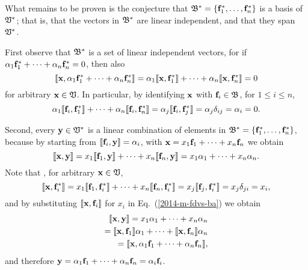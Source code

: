 What remains to be proven is the conjecture that
${\frak B}^\ast  = \{{\bf f}_1^\ast ,\ldots , {\bf f}_n^\ast \}$
is a basis of ${\frak V}^\ast $; that is, that the vectors in ${\frak B}^\ast $ are linear independent,
and that they span ${\frak V}^\ast $.

First observe that ${\frak B}^\ast $ is a set of linear independent vectors,
for if
$ \alpha_1 {\bf f}_1^\ast  + \cdots + \alpha_n {\bf f}_n^\ast =0$, then also
\begin{equation}
 \llbracket {\bf x},\alpha_1 {\bf f}_1^\ast  + \cdots + \alpha_n {\bf f}_n^\ast \rrbracket =
 \alpha_1 \llbracket {\bf x},{\bf f}_1^\ast \rrbracket  + \cdots + \alpha_n \llbracket {\bf x},{\bf f}_n^\ast \rrbracket =
0
\end{equation}
for arbitrary ${\bf x}\in {\frak V}$.
In particular, by identifying ${\bf x}$ with ${\bf f}_i \in {\frak B}$, for $1 \le i \le n$,
\begin{equation}
 \alpha_1 \llbracket {\bf f}_i,{\bf f}_1^\ast \rrbracket  + \cdots + \alpha_n \llbracket {\bf f}_i,{\bf f}_n^\ast \rrbracket = \alpha_j \llbracket {\bf f}_i,{\bf f}_j^\ast \rrbracket  = \alpha_j \delta_{ij} = \alpha_i=
0.
\end{equation}

Second,  every ${\bf y} \in {\frak V}^\ast $ is a linear combination of elements in
${\frak B}^\ast  = \{{\bf f}_1^\ast ,\ldots , {\bf f}_n^\ast \}$, because by
starting from
$\llbracket {\bf f}_i,  {\bf y}\rrbracket =\alpha_i$,
with
$ {\bf x} = x_1 {\bf f}_1 +\cdots + x_n {\bf f}_n$
we obtain
\begin{equation}
 \llbracket {\bf x},{\bf y}\rrbracket
= x_1 \llbracket {\bf f}_1,{\bf y}\rrbracket  +\cdots + x_n \llbracket {\bf f}_n,{\bf y}\rrbracket
= x_1 \alpha_1 +\cdots + x_n \alpha_n.
\label{2014-m-fdvs-ba}
\end{equation}
Note that , for arbitrary  ${\bf x}\in {\frak V}$,
\begin{equation}
 \llbracket {\bf x},{\bf f}_i^\ast \rrbracket
= x_1 \llbracket {\bf f}_1,{\bf f}_i^\ast \rrbracket  +\cdots + x_n \llbracket {\bf f}_n,{\bf f}_i^\ast \rrbracket =  x_j \llbracket {\bf f}_j,{\bf f}_i^\ast \rrbracket =  x_j \delta_{ji}=  x_i,
\label{2014-m-ch-fdlvs-kju}
\end{equation}
and by substituting $\llbracket {\bf x},{\bf f}_i\rrbracket $ for $x_i$ in Eq.~(\ref{2014-m-fdvs-ba}) we obtain
\begin{equation}
\begin{split}
 \llbracket {\bf x},{\bf y}\rrbracket  =
 x_1\alpha_1 +\cdots + x_n \alpha_n \\
= \llbracket {\bf x},{\bf f}_1\rrbracket  \alpha_1 +\cdots + \llbracket {\bf x},{\bf f}_n\rrbracket  \alpha_n  \\
= \llbracket {\bf x},\alpha_1 {\bf f}_1 +\cdots + \alpha_n{\bf f}_n\rrbracket  ,
\label{2014-m-fdvs-ba1}
\end{split}
\end{equation}
and therefore ${\bf y} =\alpha_1 {\bf f}_1 +\cdots + \alpha_n{\bf f}_n=\alpha_i{\bf f}_i$.

